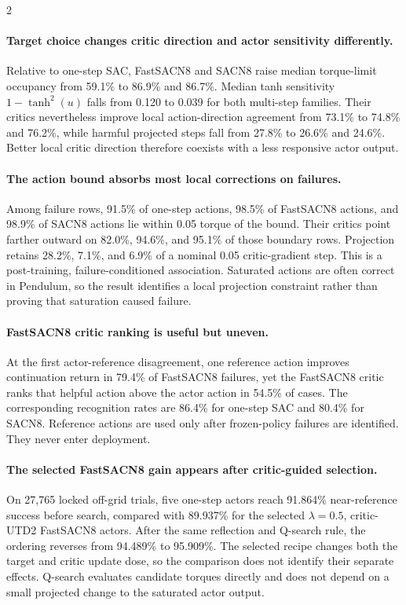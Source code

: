 \vspace{-1mm}
\begin{multicols}{2}
\small
\paragraph{Target choice changes critic direction and actor sensitivity differently.}
Relative to one-step SAC, FastSACN8 and SACN8 raise median torque-limit occupancy from 59.1\% to 86.9\% and 86.7\%. Median tanh sensitivity $1-\tanh^2(u)$ falls from 0.120 to 0.039 for both multi-step families. Their critics nevertheless improve local action-direction agreement from 73.1\% to 74.8\% and 76.2\%, while harmful projected steps fall from 27.8\% to 26.6\% and 24.6\%. Better local critic direction therefore coexists with a less responsive actor output.

\paragraph{The action bound absorbs most local corrections on failures.}
Among failure rows, 91.5\% of one-step actions, 98.5\% of FastSACN8 actions, and 98.9\% of SACN8 actions lie within 0.05 torque of the bound. Their critics point farther outward on 82.0\%, 94.6\%, and 95.1\% of those boundary rows. Projection retains 28.2\%, 7.1\%, and 6.9\% of a nominal 0.05 critic-gradient step. This is a post-training, failure-conditioned association. Saturated actions are often correct in Pendulum, so the result identifies a local projection constraint rather than proving that saturation caused failure.

\paragraph{FastSACN8 critic ranking is useful but uneven.}
At the first actor-reference disagreement, one reference action improves continuation return in 79.4\% of FastSACN8 failures, yet the FastSACN8 critic ranks that helpful action above the actor action in 54.5\% of cases. The corresponding recognition rates are 86.4\% for one-step SAC and 80.4\% for SACN8. Reference actions are used only after frozen-policy failures are identified. They never enter deployment.

\paragraph{The selected FastSACN8 gain appears after critic-guided selection.}
On 27,765 locked off-grid trials, five one-step actors reach 91.864\% near-reference success before search, compared with 89.937\% for the selected $\lambda=0.5$, critic-UTD2 FastSACN8 actors. After the same reflection and Q-search rule, the ordering reverses from 94.489\% to 95.909\%. The selected recipe changes both the target and critic update dose, so the comparison does not identify their separate effects. Q-search evaluates candidate torques directly and does not depend on a small projected change to the saturated actor output.


\end{multicols}
